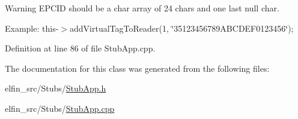 \begin{DoxyWarning}{Warning}
E\-P\-C\-I\-D should be a char array of 24 chars and one last null char.\par
Example\-: this-\/$>$add\-Virtual\-Tag\-To\-Reader(1, \char`\"{}35123456789\-A\-B\-C\-D\-E\-F0123456\char`\"{}); 
\end{DoxyWarning}


Definition at line 86 of file Stub\-App.\-cpp.



The documentation for this class was generated from the following files\-:\begin{DoxyCompactItemize}
\item 
elfin\-\_\-src/\-Stubs/\hyperlink{_stub_app_8h}{Stub\-App.\-h}\item 
elfin\-\_\-src/\-Stubs/\hyperlink{_stub_app_8cpp}{Stub\-App.\-cpp}\end{DoxyCompactItemize}
